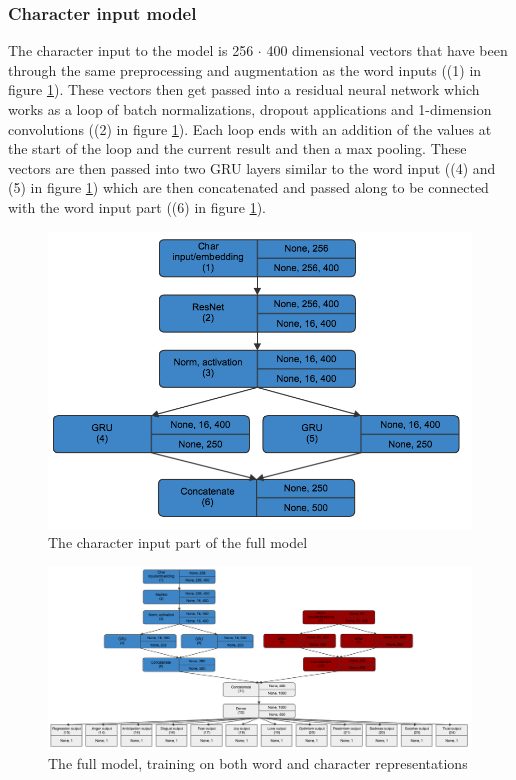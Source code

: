 \subsubsection{Character input model}
The character input to the model is 256 $\cdot$ 400 dimensional vectors that have been through the same preprocessing and augmentation as the word inputs ((1) in figure \ref{fig:charmodel}). These vectors then get passed into a residual neural network which works as a loop of batch normalizations, dropout applications and 1-dimension convolutions ((2) in figure \ref{fig:charmodel}). Each loop ends with an addition of the values at the start of the loop and the current result and then a max pooling. These vectors are then passed into two GRU layers similar to the word input ((4) and (5) in figure \ref{fig:charmodel}) which are then concatenated and passed along to be connected with the word input part ((6) in figure \ref{fig:charmodel}).
\begin{figure}[H]
	\centering
		\includegraphics[scale=0.35]{pictures/char_model.png}
		\caption{The character input part of the full model}
		\label{fig:charmodel}
\end{figure}
\begin{figure}[H]
    \centering
        \includegraphics[width=\textwidth]{pictures/model.png}
        \caption{The full model, training on both word and character representations}
        \label{fig:fullmodel}
\end{figure}

